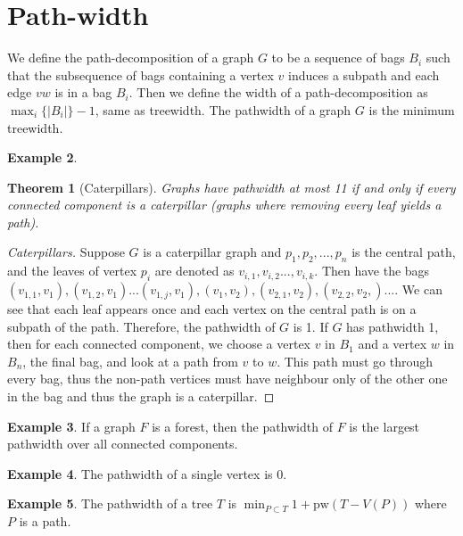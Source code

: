 \documentclass[]{article}
\newcommand{\pw}{\text{pw}}
\newtheorem{theorem}{Theorem}
\theoremstyle{definition}
\newtheorem{example}[theorem]{Example}
\numberwithin{theorem}{section}
\numberwithin{equation}{section}
\begin{document}
\section{Path-width}
We define the path-decomposition of a graph $G$ to be a sequence of bags $B_i$ such that the subsequence of bags containing a vertex $v$ induces a subpath and each edge $vw$ is in a bag $B_i$. Then we define the width of a path-decomposition as $\max_i \lbrace |B_i| \rbrace -1$, same as treewidth. The pathwidth of a graph $G$ is the minimum treewidth.
\begin{example}
	\begin{theorem}[Caterpillars]
		Graphs have pathwidth at most 11 if and only if every connected component is a caterpillar (graphs where removing every leaf yields a path).
	\end{theorem}
	\begin{proof}[Caterpillars]
		Suppose $G$ is a caterpillar graph and $p_1, p_2, ..., p_n$ is the central path, and the leaves of vertex $p_i$ are denoted as $v_{i, 1}, v_{i, 2} ..., v_{i, k}$. Then have the bags $(v_{1, 1}, v_1), (v_{1, 2}, v_1)... (v_{1, j}, v_1), (v_1, v_2), (v_{2, 1}, v_2), (v_{2,2}, v_2,)... $. We can see that each leaf appears once and each vertex on the central path is on a subpath of the path. Therefore, the pathwidth of $G$ is 1. If $G$ has pathwidth 1, then for each connected component, we choose a vertex $v$ in $B_1$ and a vertex $w$ in $B_n$, the final bag, and look at a path from $v$ to $w$. This path must go through every bag, thus the non-path vertices must have neighbour only of the other one in the bag and thus the graph is a caterpillar. 
	\end{proof}
	
\end{example}
\begin{example}
	If a graph $F$ is a forest, then the pathwidth of $F$ is the largest pathwidth over all connected components.
\end{example}
\begin{example}
	The pathwidth of a single vertex is 0.
\end{example}
\begin{example}
	The pathwidth of a tree $T$ is $\min_{P \subset T} 1 + \pw(T - V(P))$ where $P$ is a path. 
\end{example}
\end{document}
